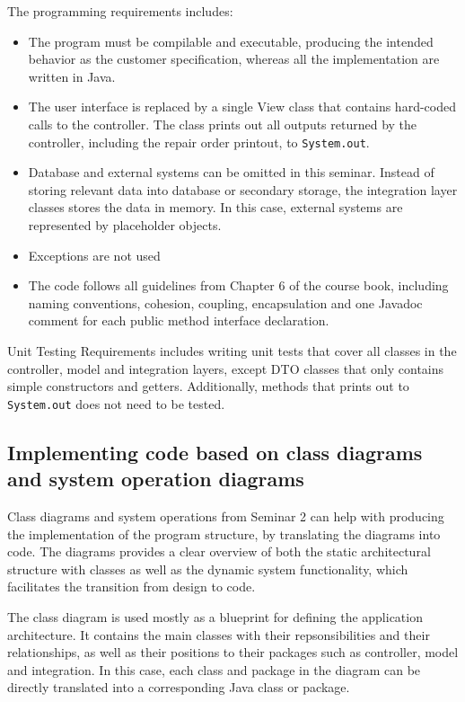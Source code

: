 \documentclass[a4paper]{scrartcl}
\begin{document}
The programming requirements includes:
\begin{itemize}
    \item The program must be compilable and executable, producing the intended behavior as the customer specification, whereas all the implementation are written in Java.
    \item The user interface is replaced by a single View class that contains hard-coded calls to the controller. The class prints out all outputs returned by the controller, including the repair order printout, to \texttt{System.out}.
    \item Database and external systems can be omitted in this seminar. Instead of storing relevant data into database or secondary storage, the integration layer classes stores the data in memory. In this case, external systems are represented by placeholder objects.
    \item Exceptions are not used
    \item The code follows all guidelines from Chapter 6 of the course book, including naming conventions, cohesion, coupling, encapsulation and one Javadoc comment for each public method interface declaration.
\end{itemize}

Unit Testing Requirements includes writing unit tests that cover all classes in the controller, model and integration layers, except DTO classes that only contains simple constructors and getters. Additionally, methods that prints out to \texttt{System.out} does not need to be tested.

\subsection{Implementing code based on class diagrams and system operation diagrams}

Class diagrams and system operations from Seminar 2 can help with producing the implementation of the program structure, by translating the diagrams into code. The diagrams provides a clear overview of both the static architectural structure with classes as well as the dynamic system functionality, which facilitates the transition from design to code. 

The class diagram is used mostly as a blueprint for defining the application architecture. It contains the main classes with their repsonsibilities and their relationships, as well as their positions to their packages such as controller, model and integration. In this case, each class and package in the diagram can be directly translated into a corresponding Java class or package.
\end{document}

